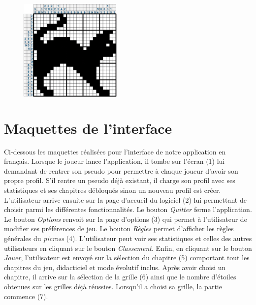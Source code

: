 \documentclass{report}
\begin{document}
\begin{figure}[H]
			\hspace{1cm}
			\includegraphics[width=5cm]{../Images/cat/cat6.png}
		\end{figure}
		
	
	\section{Maquettes de l'interface}
      
      		Ci-dessous les maquettes réalisées pour l'interface de notre application en français. Lorsque le joueur lance l'application, il tombe sur l'écran (1) lui demandant de rentrer son pseudo pour permettre à chaque joueur d'avoir son propre profil. S'il rentre un pseudo déjà existant, il charge son profil avec ses statistiques et ses chapitres débloqués sinon un nouveau profil est créer. L'utilisateur arrive ensuite sur la page d'accueil du logiciel (2) lui permettant de choisir parmi les différentes fonctionnalités. Le bouton \textit{Quitter} ferme l'application. Le bouton \textit{Options} renvoit sur la page d'options (3) qui permet à l'utilisateur de modifier ses préférences de jeu. Le bouton \textit{Règles}  permet d'afficher les règles générales du \textit{picross} (4). L'utilisateur peut voir ses statistiques et celles des autres utilisateurs en cliquant sur le bouton \textit{Classement}. Enfin, en cliquant sur le bouton \textit{Jouer}, l'utilisateur est envoyé sur la sélection du  chapitre (5) comportant tout les chapitres du jeu, didacticiel et mode évolutif inclus. Après avoir choisi un chapitre, il arrive sur la sélection de la grille (6) ainsi que le nombre d'étoiles obtenues sur les grilles déjà réussies. Lorsqu'il a choisi sa grille, la partie commence (7).
		
\end{document}
